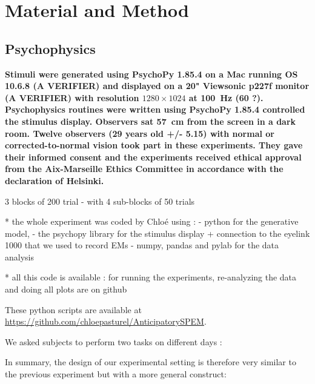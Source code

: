 \documentclass[profile,final,english, draft]{article}%
\begin{document}
\section{Material and Method}
\subsection{Psychophysics}




\textbf{Stimuli were generated using PsychoPy 1.85.4 on a Mac running OS 10.6.8 (A VERIFIER) and displayed on a 20" Viewsonic p227f monitor (A VERIFIER) with resolution $1280\times 1024$ at 100~\si{\Hz} (60 ?). Psychophysics routines were written using PsychoPy 1.85.4 controlled the stimulus display. Observers sat 57~\si{\cm} from the screen in a dark room. Twelve observers (29 years old +/- 5.15) with normal or corrected-to-normal vision took part in these experiments. They gave their informed consent and the experiments received ethical approval from the Aix-Marseille Ethics Committee in accordance with the declaration of Helsinki.}


3 blocks of 200 trial - with 4 sub-blocks of 50 trials


 * the whole experiment was coded by Chloé using :
 - python for the generative model,
 - the psychopy library for the stimulus display + connection to the eyelink 1000 that we used to record EMs
 - numpy, pandas and pylab for the data analysis

  * all this code is available : for running the experiments, re-analyzing the data and doing all plots are on github

These python scripts are available at \url{https://github.com/chloepasturel/AnticipatorySPEM}.


We asked subjects to perform two tasks on different days :

In summary, the design of our experimental setting is therefore very similar to the previous experiment but with a more general construct:
\end{document}
